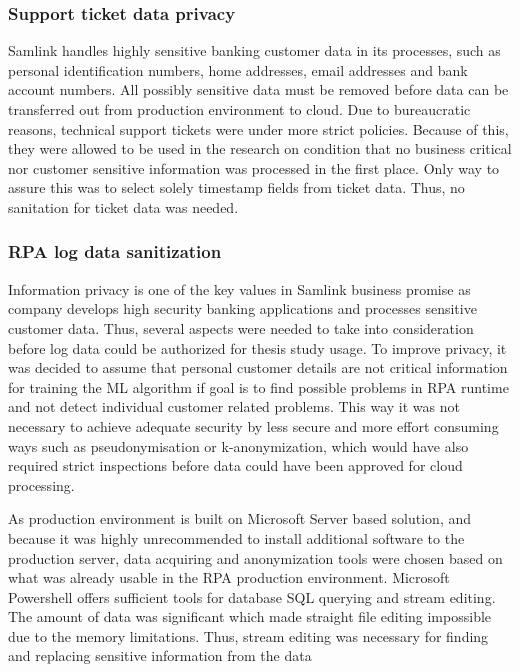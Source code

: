 \documentclass[english, 12pt, a4paper, elec, utf8, a-1b, online]{aaltothesis}
\begin{document}
\subsubsection*{Support ticket data privacy}
Samlink handles highly sensitive banking customer data in its processes,
such as personal identification numbers, home addresses, email addresses and bank account numbers.
All possibly sensitive data must be removed
before data can be transferred out from production environment to cloud.
Due to bureaucratic reasons,
technical support tickets were under more strict policies.
Because of this,
they were allowed to be used in the research
on condition that no business critical nor customer sensitive information
was processed in the first place.
Only way to assure this
was to select solely timestamp fields from ticket data.
Thus, no sanitation for ticket data was needed.

\subsubsection*{RPA log data sanitization}
Information privacy is one of the key values in Samlink business promise
as company develops high security banking applications
and processes sensitive customer data.
Thus, several aspects were needed to take into consideration
before log data could be authorized for thesis study usage.
To improve privacy,
it was decided to assume
that personal customer details are not critical information
for training the ML algorithm
if goal is to find possible problems in RPA runtime
and not detect individual customer related problems.
This way it was not necessary to achieve adequate security
by less secure and more effort consuming ways
such as pseudonymisation or k-anonymization,
which would have also required strict inspections
before data could have been approved for cloud processing.

As production environment is built on Microsoft Server based solution,
and because it was highly unrecommended
to install additional software to the production server,
data acquiring and anonymization tools were chosen
based on what was already usable in the RPA production environment.
Microsoft Powershell offers sufficient tools
for database SQL querying
and stream editing.
The amount of data was significant
which made straight file editing impossible
due to the memory limitations.
Thus, stream editing was necessary
for finding and replacing
sensitive information from the data
\end{document}
